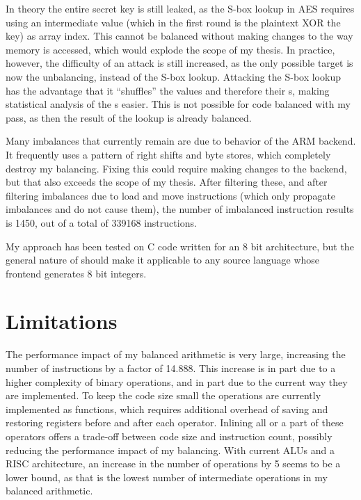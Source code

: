 In theory the entire secret key is still leaked, as the S-box lookup in AES requires using an intermediate value (which in the first round is the plaintext XOR the key) as array index.
This cannot be balanced without making changes to the way memory is accessed, which would explode the scope of my thesis.
In practice, however, the difficulty of an attack is still increased, as the only possible target is now the unbalancing, instead of the S-box lookup.
Attacking the S-box lookup has the advantage that it ``shuffles'' the values and therefore their \hammingw{}s, making statistical analysis of the \hammingw{}s easier.
This is not possible for code balanced with my pass, as then the result of the lookup is already balanced.

Many imbalances that currently remain are due to behavior of the \llvm{} ARM backend.
It frequently uses a pattern of right shifts and byte stores, which completely destroy my balancing.
Fixing this could require making changes to the backend, but that also exceeds the scope of my thesis.
After filtering these, and after filtering imbalances due to load and move instructions (which only propagate imbalances and do not cause them), the number of imbalanced instruction results is 1450, out of a total of 339168 instructions.

My approach has been tested on C code written for an 8 bit architecture, but the general nature of \llvm{} should make it applicable to any source language whose frontend generates 8 bit integers.

\section{Limitations}
The performance impact of my balanced arithmetic is very large, increasing the number of instructions by a factor of 14.888.
This increase is in part due to a higher complexity of binary operations, and in part due to the current way they are implemented.
To keep the code size small the operations are currently implemented as functions, which requires additional overhead of saving and restoring registers before and after each operator.
Inlining all or a part of these operators offers a trade-off between code size and instruction count, possibly reducing the performance impact of my balancing.
With current ALUs and a RISC architecture, an increase in the number of operations by 5 seems to be a lower bound, as that is the lowest number of intermediate operations in my balanced arithmetic.

